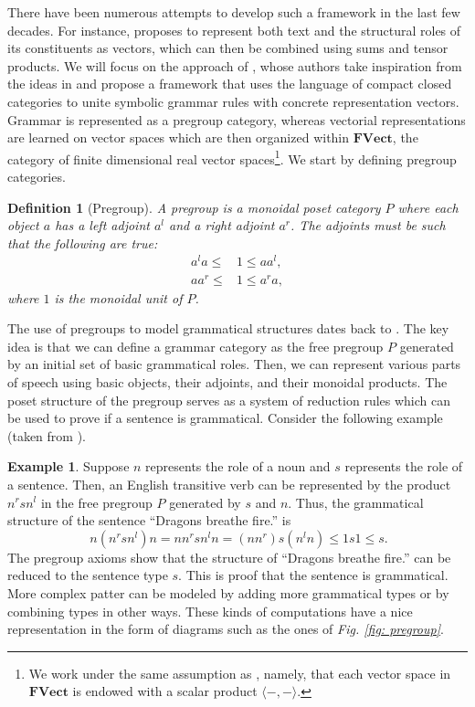 \documentclass[11pt,a4paper,openright,twoside]{report}
\newcounter{mycounter}
\theoremstyle{plain}
\newtheorem{definition}[mycounter]{Definition}
\theoremstyle{definition}
\newtheorem{example}[mycounter]{Example}
\newcommand\dblquote[1]{\textquotedblleft #1\textquotedblright}
\begin{document}
There have been numerous attempts to develop such a framework in the last few decades. For instance, \cite{clark2007combining} proposes to represent both text and the structural roles of its constituents as vectors, which can then be combined using sums and tensor products. We will focus on the approach of \cite{coecke2010mathematical}, whose authors take inspiration from the ideas in \cite{clark2007combining} and propose a framework that uses the language of compact closed categories to unite symbolic grammar rules with concrete representation vectors. Grammar is represented as a pregroup category, whereas vectorial representations are learned on vector spaces which are then organized within $\mathbf{FVect}$, the category of finite dimensional real vector spaces\footnote{We work under the same assumption as \cite{coecke2010mathematical}, namely, that each vector space in $\mathbf{FVect}$ is endowed with a scalar product $\langle-,-\rangle$.}. We start by defining pregroup categories.

\begin{definition}[Pregroup]
  A pregroup is a monoidal poset category $P$ where each object $a$ has a left adjoint $a^l$ and a right adjoint $a^r$. The adjoints must be such that the following are true:
  \begin{align*}
    a^la \leq &1 \leq aa^l,\\
    aa^r \leq &1 \leq a^ra,
  \end{align*}
  where $1$ is the monoidal unit of $P$.
\end{definition}

The use of pregroups to model grammatical structures dates back to \cite{lambek1999type}. The key idea is that we can define a grammar category as the free pregroup $P$ generated by an initial set of basic grammatical roles. Then, we can represent various parts of speech using basic objects, their adjoints, and their monoidal products. The poset structure of the pregroup serves as a system of reduction rules which can be used to prove if a sentence is grammatical. Consider the following example (taken from \cite{lewis2019compositionality}).

\begin{example}
  Suppose $n$ represents the role of a noun and $s$ represents the role of a sentence. Then, an English transitive verb can be represented by the product $n^rsn^l$ in the free pregroup $P$ generated by $s$ and $n$. Thus, the grammatical structure of the sentence \dblquote{Dragons breathe fire.} is
  \begin{equation}\
    \label{eq: grammreduction}
    n(n^rsn^l)n = nn^rsn^ln = (nn^r)s(n^ln) \leq 1s1 \leq s.
  \end{equation}
  The pregroup axioms show that the structure of  \dblquote{Dragons breathe fire.} can be reduced to the sentence type $s$. This is proof that the sentence is grammatical. More complex patter can be modeled by adding more grammatical types or by combining types in other ways. These kinds of computations have a nice representation in the form of diagrams such as the ones of \textit{Fig. \ref{fig: pregroup}}.
\end{example}
\end{document}
